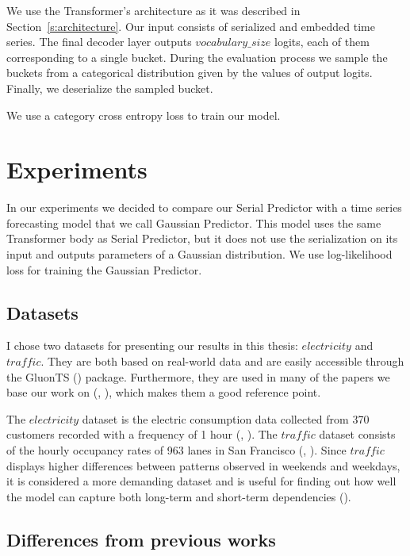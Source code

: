 \documentclass[en]{pracamgr}
\begin{document}
	We use the Transformer's architecture as it was described in Section~\ref{s:architecture}. Our input consists of serialized and embedded time series. The final decoder layer outputs $vocabulary\_size$ logits, each of them corresponding to a single bucket. During the evaluation process we sample the buckets from a categorical distribution given by the values of output logits. Finally, we deserialize the sampled bucket.
	
	We use a category cross entropy loss to train our model.
	
	
	
	\chapter{Experiments}
	
	In our experiments we decided to compare our Serial Predictor with a time series forecasting model that we call Gaussian Predictor. This model uses the same Transformer body as Serial Predictor, but it does not use the serialization on its input and outputs parameters of a Gaussian distribution. We use log-likelihood loss for training the Gaussian Predictor.
	
	\section{Datasets}
	
	I chose two datasets for presenting our results in this thesis: $electricity$ and $traffic$. They are both based on real-world data and are easily accessible through the GluonTS (\cite{gluonts}) package. Furthermore, they are used in many of the papers we base our work on (\cite{enhancing}, \cite{deepar}), which makes them a good reference point.
	
	The $electricity$ dataset is the electric consumption data collected from 370 customers recorded with a frequency of 1 hour (\cite{enhancing}, \cite{deepar}). The $traffic$ dataset consists of the hourly occupancy rates of 963 lanes in San Francisco (\cite{enhancing}, \cite{deepar}). Since $traffic$ displays higher differences between patterns observed in weekends and weekdays, it is considered a more demanding dataset and is useful for finding out how well the model can capture both long-term and short-term dependencies (\cite{enhancing}).
	
	
	
	\section{Differences from previous works}\label{s:diff}
	
\end{document}
